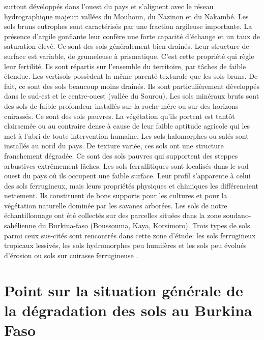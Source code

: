 \documentclass[a4paper,11pt]{article}
\begin{document}
surtout développés dans l'ouest du pays et s'alignent avec le réseau
hydrographique majeur: vallées du Mouhoun, du Nazinon et du
Nakambé. Les sols bruns eutrophes sont caractérisés par une fraction
argileuse importante. La présence d'argile gonflante leur confère une
forte capacité d'échange et un taux de saturation élevé. Ce sont des
sols généralement bien drainés. Leur structure de surface est
variable, de grumeleuse à prismatique. C'est cette propriété qui règle
leur fertilité. Ils sont répartis sur l'ensemble du territoire, par
tâches de faible étendue. Les vertisols possèdent la même parenté
texturale que les sols bruns. De fait, ce sont des sols beaucoup moins
drainés. Ils sont particulièrement développés dans le sud-est et le
centre-ouest (vallée du Sourou). Les sols minéraux bruts sont des sols
de faible profondeur installés sur la roche-mère ou sur des horizons
cuirassés. Ce sont des sols pauvres. La végétation qu'ils portent est
tantôt clairsemée ou au contraire dense à cause de leur faible
aptitude agricole qui les met à l'abri de toute intervention
humaine. Les sols halomorphes ou salés sont installés au nord du
pays. De texture variée, ces sols ont une structure franchement
dégradée. Ce sont des sols pauvres qui supportent des steppes
arbustives extrêmement lâches. Les sols ferrallitiques sont localisés
dans le sud-ouest du pays où ils occupent une faible surface. Leur
profil s'apparente à celui des sols ferrugineux, mais leurs propriétés
physiques et chimiques les différencient nettement. Ils constituent de
bons supports pour les cultures et pour la végétation naturelle
dominée par les savanes arborées. Les sols de notre échantillonnage
ont été collectés sur des parcelles situées dans la zone
soudano-sahélienne du Burkina-faso (Boussouma, Kaya, Korsimoro). Trois
types de sols parmi ceux sus-cités sont rencontrés dans cette zone
d'étude: les sols ferrugineux tropicaux lessivés, les sols
hydromorphes peu humifères et les sols peu évolués d'érosion ou sols
sur cuirasse ferrugineuse \cite{TIROGO_2017}.

\section{Point sur la situation générale de la dégradation des sols au Burkina Faso}
\end{document}
